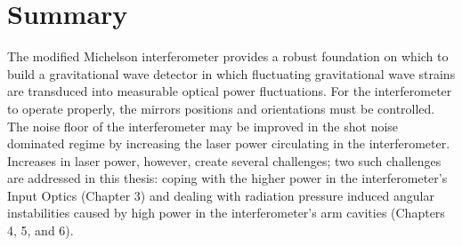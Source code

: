 

\section{Summary}
The modified Michelson interferometer provides a robust foundation on
which to build a gravitational wave detector in which fluctuating
gravitational wave strains are transduced into measurable optical
power fluctuations.  For the interferometer to operate properly, the
mirrors positions and orientations must be controlled.  The noise
floor of the interferometer may be improved in the shot noise
dominated regime by increasing the laser power circulating in the
interferometer.  Increases in laser power, however, create several
challenges; two such challenges are addressed in this thesis: coping
with the higher power in the interferometer's Input Optics (Chapter 3)
and dealing with radiation pressure induced angular instabilities
caused by high power in the interferometer's arm cavities (Chapters 4,
5, and 6).
